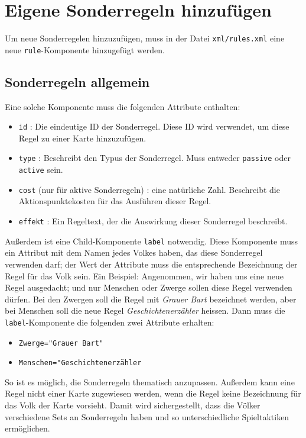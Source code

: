 \documentclass[a4paper,11pt]{report}
\begin{document}
\section{Eigene Sonderregeln hinzufügen}
Um neue Sonderregelen hinzuzufügen, muss in der Datei \verb+xml/rules.xml+ eine neue \verb+rule+-Komponente hinzugefügt werden.

\subsection{Sonderregeln allgemein}
Eine solche Komponente muss die folgenden Attribute enthalten:
\begin{itemize}
	\item \verb+id+ : Die eindeutige ID der Sonderregel. Diese ID wird verwendet, um diese Regel zu einer Karte hinzuzufügen.
	\item \verb+type+ : Beschreibt den Typus der Sonderregel. Muss entweder \verb+passive+ oder \verb+active+ sein.
	\item \verb+cost+ (nur für aktive Sonderregeln) : eine natürliche Zahl. Beschreibt die Aktionspunktekosten für das Ausführen dieser Regel.
	\item \verb+effekt+ : Ein Regeltext, der die Auswirkung dieser Sonderregel beschreibt.
\end{itemize}
Außerdem ist eine Child-Komponente \verb+label+ notwendig. Diese Komponente muss ein Attribut mit dem Namen jedes Volkes haben, das diese Sonderregel verwenden darf; der Wert der Attribute muss die entsprechende Bezeichnung der Regel für das Volk sein. Ein Beispiel: Angenommen, wir haben uns eine neue Regel ausgedacht; und nur Menschen oder Zwerge sollen diese Regel verwenden dürfen. Bei den Zwergen soll die Regel mit \emph{Grauer Bart} bezeichnet werden, aber bei Menschen soll die neue Regel \emph{Geschichtenerzähler} heissen. Dann muss die \verb+label+-Komponente die folgenden zwei Attribute erhalten:
\begin{itemize}
	\item \verb+Zwerge="Grauer Bart"+
	\item \verb+Menschen="Geschichtenerzähler+
\end{itemize}
So ist es möglich, die Sonderregeln thematisch anzupassen. Außerdem kann eine Regel nicht einer Karte zugewiesen werden, wenn die Regel keine Bezeichnung für das Volk der Karte vorsieht. Damit wird sichergestellt, dass die Völker verschiedene Sets an Sonderregeln haben und so unterschiedliche Spieltaktiken ermöglichen.
\end{document}
